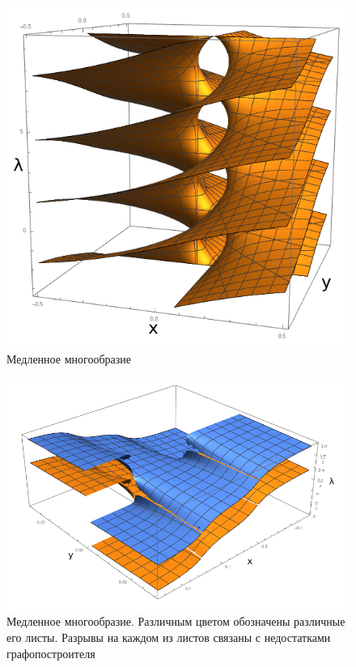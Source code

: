 \begin{figure}[H]
\centering
\includegraphics[scale=0.45]{img/MM.png}
\caption{Медленное многообразие}
\end{figure}

\begin{figure}[H]
\centering
\includegraphics[scale=0.45]{img/MM2.png}
\caption{Медленное многообразие. Различным цветом обозначены различные его листы. Разрывы на каждом из листов связаны с недостатками графопостроителя}
\end{figure} 
